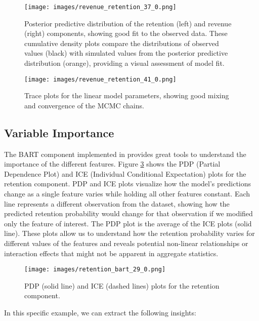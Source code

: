 \documentclass[11pt]{amsart}
\theoremstyle{definition}
\begin{document}
\begin{figure}
    \centering
    \texttt{[image: images/revenue\_retention\_37\_0.png]}
    \caption{Posterior predictive distribution of the retention (left) and revenue (right) components, showing good fit to
        the observed data. These cumulative density plots compare the distributions of observed values (black) with simulated
        values from the posterior predictive distribution (orange), providing a visual assessment of model fit.}
    \label{fig:posterior_predictive}
\end{figure}

\begin{figure}
    \centering
    \texttt{[image: images/revenue\_retention\_41\_0.png]}
    \caption{Trace plots for the linear model parameters, showing good mixing and convergence of the MCMC chains.}
    \label{fig:trace}
\end{figure}

\subsection{Variable Importance}

The BART component implemented in \cite{quiroga2022bart} provides great tools to understand the importance of the different
features. Figure \ref{fig:ice_plot} shows the PDP (Partial Dependence Plot) and ICE (Individual Conditional Expectation)
plots for the retention component. PDP and ICE plots visualize how the model's predictions change as a single feature varies
while holding all other features constant. Each line represents a different observation from the dataset, showing how the
predicted retention probability would change for that observation if we modified only the feature of interest. The PDP
plot is the average of the ICE plots (solid line). These plots allow us to understand how the retention probability varies
for different values of the features and reveals potential non-linear relationships or interaction effects that might not
be apparent in aggregate statistics. \\

\begin{figure}
    \centering
    \texttt{[image: images/retention\_bart\_29\_0.png]}
    \caption{PDP (solid line) and ICE (dashed lines) plots for the retention component.}
    \label{fig:ice_plot}
\end{figure}

In this specific example, we can extract the following insights:
\end{document}
